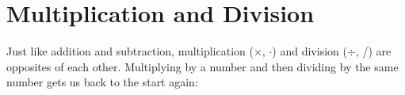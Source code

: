     \section{Multiplication and Division}
            \nopagebreak
      \label{m38346*id172708}Just like addition and subtraction, multiplication ($\ensuremath{\times}$, $\ensuremath{\cdot}$) and
division ($÷$, /) are opposites of each other. Multiplying by a number and
then dividing by the same number gets us back to the start again:\par 
      \label{m38346*uid8}\nopagebreak\noindent{}
